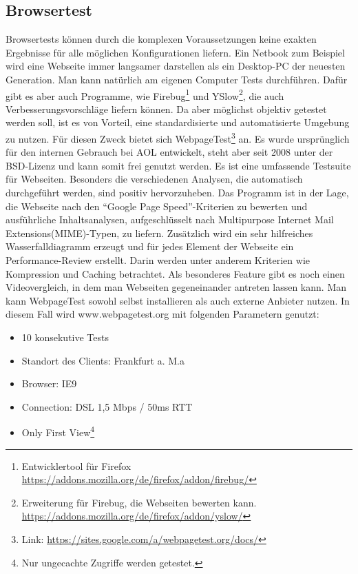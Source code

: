 \subsection{Browsertest}
Browsertests k\"onnen durch die komplexen Voraussetzungen keine exakten Ergebnisse f\"ur alle m\"oglichen Konfigurationen liefern. Ein Netbook zum Beispiel wird eine Webseite immer langsamer darstellen als ein Desktop-PC der neuesten Generation. Man kann natürlich am eigenen Computer Tests durchführen. Dafür gibt es aber auch Programme, wie Firebug\footnote{Entwicklertool f\"ur Firefox \url{https://addons.mozilla.org/de/firefox/addon/firebug/}} und YSlow\footnote{Erweiterung f\"ur Firebug, die Webseiten bewerten kann. \url{https://addons.mozilla.org/de/firefox/addon/yslow/}}, die auch Verbesserungsvorschläge liefern können. Da aber möglichst objektiv getestet werden soll, ist es von Vorteil, eine standardisierte und automatisierte Umgebung zu nutzen. Für diesen Zweck bietet sich WebpageTest\footnote{Link: \url{https://sites.google.com/a/webpagetest.org/docs/}} an. Es wurde ursprünglich für den internen Gebrauch bei AOL entwickelt, steht aber seit 2008 unter der BSD-Lizenz und kann somit frei genutzt werden. Es ist eine umfassende Testsuite für Webseiten. Besonders die verschiedenen Analysen, die automatisch durchgeführt werden, sind positiv hervorzuheben. Das Programm ist in der Lage, die Webseite nach den "`Google Page Speed"'-Kriterien zu bewerten und ausführliche Inhaltsanalysen, aufgeschlüsselt nach Multipurpose Internet Mail Extensions(MIME)-Typen, zu liefern. Zusätzlich wird ein sehr hilfreiches Wasserfalldiagramm erzeugt und für jedes Element der Webseite ein Performance-Review erstellt. Darin werden unter anderem Kriterien wie Kompression und Caching betrachtet. Als besonderes Feature gibt es noch einen Videovergleich, in dem man Webseiten gegeneinander antreten lassen kann. Man kann WebpageTest sowohl selbst installieren als auch externe Anbieter nutzen. In diesem Fall wird www.webpagetest.org mit folgenden Parametern genutzt:
\begin{itemize}
  \item 10 konsekutive Tests
  \item Standort des Clients: Frankfurt a. M.a
  \item Browser: IE9
  \item Connection: DSL 1,5 Mbps / 50ms RTT
  \item Only First View\footnote{Nur ungecachte Zugriffe werden getestet.}
\end{itemize}
